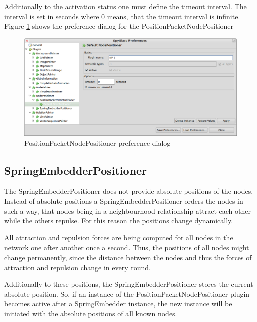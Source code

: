 Additionally to the activation status one must define the timeout interval. The interval is set in seconds where 0 means,
that the timeout interval is infinite. Figure \ref{pic:ppnp_preferences} shows the preference dialog
for the PositionPacketNodePositioner

\begin{figure}[htb]
  \begin{center}
    \includegraphics[width=13.2cm]{./pics/positionpacketnodepositioner_prefpage}
    \caption{PositionPacketNodePositioner preference dialog}
    \label{pic:ppnp_preferences}
  \end{center}
\end{figure}

\subsection{SpringEmbedderPositioner}
\label{subsection:sep}

The SpringEmbedderPositioner does not provide absolute positions of the nodes. Instead of absolute positions
a SpringEmbedderPositioner orders the nodes in such a way, that
nodes being in a neighbourhood relationship attract each other while the others repulse. For this reason
the positions change dynamically.

All attraction and repulsion forces are being computed for all nodes in the network one after another
once a second. Thus, the positions of all nodes might change permanently, since the distance between the nodes
and thus the forces of attraction and repulsion change in every round.

Additionally to these positions, the SpringEmbedderPositioner stores the current absolute position. So, if an instance of the
PositionPacketNodePositioner plugin becomes active after a SpringEmbedder instance, the new instance will be
initiated with the absolute positions of all known nodes.

